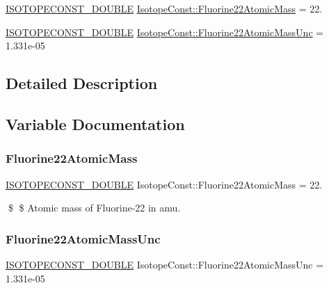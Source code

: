 \begin{DoxyCompactItemize}
\item 
\mbox{\hyperlink{group___isotope_const-_macros_ga8f45a7272ce02c0b4c65c44636ed719a}{I\+S\+O\+T\+O\+P\+E\+C\+O\+N\+S\+T\+\_\+\+D\+O\+U\+B\+LE}} \mbox{\hyperlink{group___isotope_const-_fluorine-_f22_ga7113b16517414ee502a7c75594ee0ff7}{Isotope\+Const\+::\+Fluorine22\+Atomic\+Mass}} = 22.
\item 
\mbox{\hyperlink{group___isotope_const-_macros_ga8f45a7272ce02c0b4c65c44636ed719a}{I\+S\+O\+T\+O\+P\+E\+C\+O\+N\+S\+T\+\_\+\+D\+O\+U\+B\+LE}} \mbox{\hyperlink{group___isotope_const-_fluorine-_f22_gaef037b57c83b254039dd527f276385be}{Isotope\+Const\+::\+Fluorine22\+Atomic\+Mass\+Unc}} = 1.\+331e-\/05
\end{DoxyCompactItemize}


\subsection{Detailed Description}


\subsection{Variable Documentation}
\mbox{\label{group___isotope_const-_fluorine-_f22_ga7113b16517414ee502a7c75594ee0ff7}} 
\subsubsection{\texorpdfstring{Fluorine22\+Atomic\+Mass}{Fluorine22AtomicMass}}
{\footnotesize\ttfamily \mbox{\hyperlink{group___isotope_const-_macros_ga8f45a7272ce02c0b4c65c44636ed719a}{I\+S\+O\+T\+O\+P\+E\+C\+O\+N\+S\+T\+\_\+\+D\+O\+U\+B\+LE}} Isotope\+Const\+::\+Fluorine22\+Atomic\+Mass = 22.}

\$ \$ Atomic mass of Fluorine-\/22 in amu. \mbox{\label{group___isotope_const-_fluorine-_f22_gaef037b57c83b254039dd527f276385be}} 
\subsubsection{\texorpdfstring{Fluorine22\+Atomic\+Mass\+Unc}{Fluorine22AtomicMassUnc}}
{\footnotesize\ttfamily \mbox{\hyperlink{group___isotope_const-_macros_ga8f45a7272ce02c0b4c65c44636ed719a}{I\+S\+O\+T\+O\+P\+E\+C\+O\+N\+S\+T\+\_\+\+D\+O\+U\+B\+LE}} Isotope\+Const\+::\+Fluorine22\+Atomic\+Mass\+Unc = 1.\+331e-\/05}

